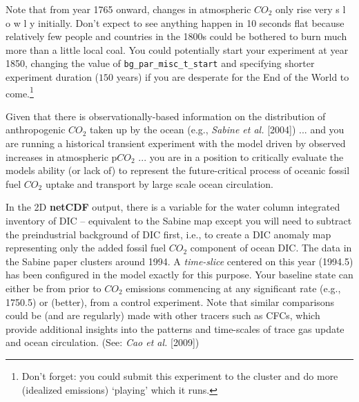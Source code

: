 \vspace{1mm}

Note that from year 1765 onward, changes in atmospheric \(CO_{2}\) only rise very s l o w l y initially. Don't expect to see anything happen in 10 seconds flat because relatively few people and countries in the 1800s could be bothered to burn much more than a little local coal. You could potentially start your experiment at year 1850, changing the value of \texttt{\small bg\_par\_misc\_t\_start} and specifying shorter experiment duration (\(150\) years) if you are desperate for the End of the World to come.\footnote{Don’t forget: you could submit this experiment to the cluster and do more (idealized emissions) ‘playing’ which it runs.} 

\vspace{1mm}

\noindent Given that there is observationally-based information on the distribution of anthropogenic \(CO_{2}\) taken up by the ocean (e.g., \textit{Sabine et al.} [2004]) ... and you are running a historical transient experiment with the model driven by observed increases in atmospheric p\(CO_{2}\) ... you are in a position to critically evaluate the models ability (or lack of) to represent the future-critical process of oceanic fossil fuel \(CO_{2}\) uptake and transport by large scale ocean circulation.

\vspace{1mm}

In the 2D \textbf{netCDF} output, there is a variable for the water column integrated inventory of DIC – equivalent to the Sabine map except you will need to subtract the preindustrial background of DIC first, i.e., to create a DIC anomaly map representing only the added fossil fuel \(CO_{2}\) component of ocean DIC. The data in the Sabine paper clusters around 1994. A \textit{time-slice} centered on this year (1994.5) has been configured in the model exactly for this purpose. Your baseline state can either be from prior to \(CO_{2}\) emissions commencing at any significant rate (e.g., 1750.5) or (better), from a control experiment. Note that similar comparisons could be (and are regularly) made with other tracers such as CFCs, which provide additional insights into the patterns and time-scales of trace gas update and ocean circulation. (See: \textit{Cao et al.} [2009])

\vspace{1mm}

